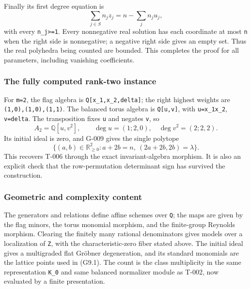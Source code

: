 \documentclass[
  10pt,
]{article}
\begin{document}
Finally its first degree equation is \[
\sum_{j\in S}n_j z_j=n-\sum_j n_j u_j,
\] with every \texttt{\small n\_\allowbreak{}j>=\allowbreak{}1}. Every
nonnegative real solution has each coordinate at most \texttt{\small n}
when the right side is nonnegative; a negative right side gives an empty
set. Thus the real polyhedra being counted are bounded. This completes
the proof for all parameters, including vanishing coefficients.

\subsubsection{The fully computed rank-two
instance}\label{the-fully-computed-rank-two-instance}

For \texttt{\small m=\allowbreak{}2}, the flag algebra is
\texttt{\small Q[\allowbreak{}x\_\allowbreak{}1,\allowbreak{}x\_\allowbreak{}2,\allowbreak{}delta]\allowbreak{}};
the right highest weights are
\texttt{\small (\allowbreak{}1,\allowbreak{}0)\allowbreak{},\allowbreak{}(\allowbreak{}1,\allowbreak{}0)\allowbreak{},\allowbreak{}(\allowbreak{}1,\allowbreak{}1)\allowbreak{}}.
The balanced torus algebra is
\texttt{\small Q[\allowbreak{}u,\allowbreak{}v]\allowbreak{}}, with
\texttt{\small u=\allowbreak{}x\_\allowbreak{}1x\_\allowbreak{}2},
\texttt{\small v=\allowbreak{}delta}. The transposition fixes
\texttt{\small u} and negates \texttt{\small v}, so \[
A_2=\mathbb Q[u,v^2],\qquad
\deg u=(1;2,0),\quad\deg v^2=(2;2,2).
\] Its initial ideal is zero, and G-009 gives the single polytope \[
\{(a,b)\in\mathbb R_{\ge0}^2:
a+2b=n,\ (2a+2b,2b)=\lambda\}.
\] This recovers T-006 through the exact invariant-algebra morphism. It
is also an explicit check that the row-permutation determinant sign has
survived the construction.

\subsubsection{Geometric and complexity
content}\label{geometric-and-complexity-content}

The generators and relations define affine schemes over
\texttt{\small Q}; the maps are given by the flag minors, the torus
monomial morphism, and the finite-group Reynolds morphism. Clearing the
finitely many rational denominators gives models over a localization of
\texttt{\small Z}, with the characteristic-zero fiber stated above. The
initial ideal gives a multigraded flat Gröbner degeneration, and its
standard monomials are the lattice points used in (G9.1). The count is
the class multiplicity in the same representation
\texttt{\small K\_\allowbreak{}0} and same balanced normalizer module as
T-002, now evaluated by a finite presentation.
\end{document}
